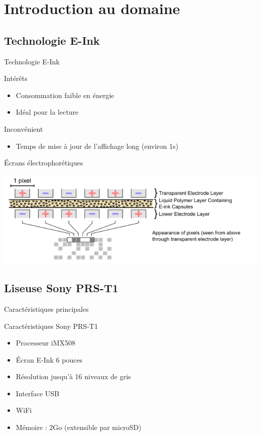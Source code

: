 \section[Intruduction]{Introduction au domaine}


\subsection[E-Ink]{Technologie E-Ink}
\begin{frame}{Technologie E-Ink}
	\begin{block}{Intérêts}
		\begin{itemize}
			\item Consommation faible en énergie
			\item Idéal pour la lecture
		\end{itemize}
	\end{block}
		\begin{block}{Inconvénient}
		\begin{itemize}
			\item Temps de mise à jour de l'affichage long (environ 1s)
		\end{itemize}
	\end{block}
\end{frame}

\begin{frame}{Écrans électrophorétiques}
\begin{center}
	\includegraphics[scale=0.65]{Electrophoretic.png}
\end{center}	
\end{frame}


\subsection[Sony PRS-T1]{Liseuse Sony PRS-T1}

\begin{frame}{Caractéristiques principales} %
	\begin{block}{Caractéristiques Sony PRS-T1}
		\begin{itemize}
			\item Processeur iMX508
			\item Écran E-Ink 6 pouces
			\item Résolution jusqu'à 16 niveaux de gris
			\item Interface USB
			\item WiFi
			\item Mémoire : 2Go (extensible par microSD)
		\end{itemize}
	\end{block}
\end{frame}

